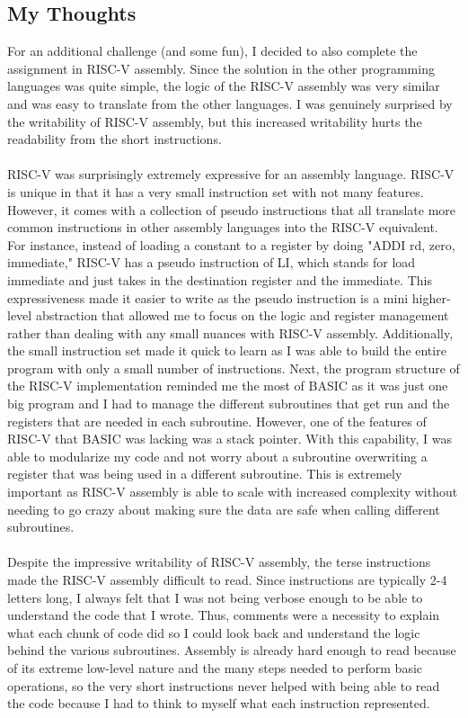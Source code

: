 \documentclass[letterpaper, 10pt, DIV=13]{scrartcl}
\numberwithin{equation}{section}
\numberwithin{figure}{section}
\numberwithin{table}{section}
\begin{document}
\subsection{My Thoughts}
For an additional challenge (and some fun), I decided to also complete the assignment in RISC-V assembly. Since the solution in the other programming languages was quite simple, the logic of the RISC-V assembly was very similar and was easy to translate from the other languages. I was genuinely surprised by the writability of RISC-V assembly, but this increased writability hurts the readability from the short instructions.
\\ \\
RISC-V was surprisingly extremely expressive for an assembly language. RISC-V is unique in that it has a very small instruction set with not many features. However, it comes with a collection of pseudo instructions that all translate more common instructions in other assembly languages into the RISC-V equivalent. For instance, instead of loading a constant to a register by doing "ADDI rd, zero, immediate," RISC-V has a pseudo instruction of LI, which stands for load immediate and just takes in the destination register and the immediate. This expressiveness made it easier to write as the pseudo instruction is a mini higher-level abstraction that allowed me to focus on the logic and register management rather than dealing with any small nuances with RISC-V assembly. Additionally, the small instruction set made it quick to learn as I was able to build the entire program with only a small number of instructions. Next, the program structure of the RISC-V implementation reminded me the most of BASIC as it was just one big program and I had to manage the different subroutines that get run and the registers that are needed in each subroutine. However, one of the features of RISC-V that BASIC was lacking was a stack pointer. With this capability, I was able to modularize my code and not worry about a subroutine overwriting a register that was being used in a different subroutine. This is extremely important as RISC-V assembly is able to scale with increased complexity without needing to go crazy about making sure the data are safe when calling different subroutines.
\\ \\
Despite the impressive writability of RISC-V assembly, the terse instructions made the RISC-V assembly difficult to read. Since instructions are typically 2-4 letters long, I always felt that I was not being verbose enough to be able to understand the code that I wrote. Thus, comments were a necessity to explain what each chunk of code did so I could look back and understand the logic behind the various subroutines. Assembly is already hard enough to read because of its extreme low-level nature and the many steps needed to perform basic operations, so the very short instructions never helped with being able to read the code because I had to think to myself what each instruction represented.
\end{document}
